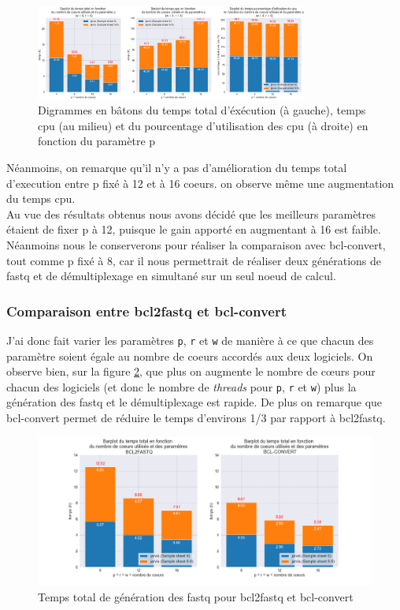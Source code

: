 \begin{figure}[H]
    \centering
    \includegraphics[width=0.8\textwidth]{img/barplot_cum_jarvis1.png}
    \caption{\footnotesize{Digrammes en bâtons du temps total d'éxécution (à gauche), temps cpu (au milieu) et du pourcentage d'utilisation des cpu (à droite) en fonction du paramètre p}}
    \label{barplot-param2}
\end{figure}

Néanmoins, on remarque qu'il n'y a pas d'amélioration du temps total d'execution entre p fixé à 12 et à 16 coeurs. on observe même une augmentation du temps cpu.\\

Au vue des résultats obtenus nous avons décidé que les meilleurs paramètres étaient de fixer p à 12, puisque le gain apporté en augmentant à 16 est faible. Néanmoins nous le conserverons pour réaliser la comparaison avec bcl-convert, tout comme p fixé à 8, car il nous permettrait de réaliser deux générations de fastq et de démultiplexage en simultané sur un seul noeud de calcul.\\

\subsubsection{Comparaison entre bcl2fastq et bcl-convert}
J'ai donc fait varier les paramètres \texttt{p}, \texttt{r} et \texttt{w} de manière à ce que chacun des paramètre soient égale au nombre de coeurs accordés aux deux logiciels. On observe bien, sur la figure \ref{fig-total-time}, que plus on augmente le nombre de cœurs pour chacun des logiciels (et donc le nombre de \emph{threads} pour \texttt{p}, \texttt{r} et \texttt{w}) plus la génération des fastq et le démultiplexage est rapide. De plus on remarque que bcl-convert permet de réduire le temps d'environs 1/3 par rapport à bcl2fastq. 

\begin{figure}[H]
    \centering
    \includegraphics[width=1\textwidth]{img/barplot_total_time_comp.png}
    \caption{\footnotesize{Temps total de génération des fastq pour bcl2fastq et bcl-convert}}
    \label{fig-total-time}
\end{figure}

